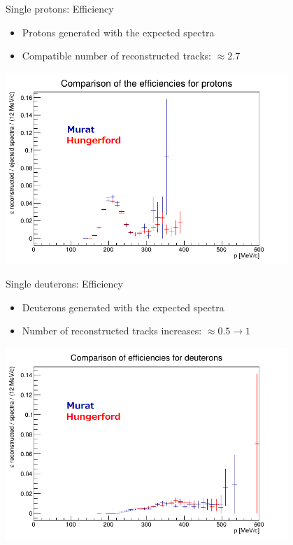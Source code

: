 \documentclass[10pt]{beamer}
\begin{document}
%
\begin{frame}{Single protons: Efficiency}
\begin{itemize}
\item Protons generated with the expected spectra
\item Compatible number of reconstructed tracks: $\approx 2.7$ \textperthousand
\end{itemize}
\begin{center}
\includegraphics[width=0.8\textwidth]{plots/ejected/proton_eff_comparison_PS}
\end{center}
\end{frame}

%
\begin{frame}{Single deuterons: Efficiency}
\begin{itemize}
\item Deuterons generated with the expected spectra
\item Number of reconstructed tracks increases: $\approx 0.5\rightarrow 1$ \textperthousand
\end{itemize}
\begin{center}
\includegraphics[width=0.8\textwidth]{plots/ejected/deuterons_eff_comparison_PS}
\end{center}
\end{frame}
\end{document}
